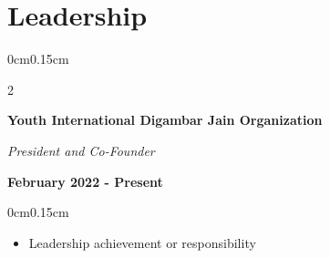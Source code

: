 \documentclass[10pt, letterpaper]{article}
\newenvironment{highlights}{
    \begin{itemize}[topsep=0pt, parsep=0pt, partopsep=0pt, itemsep=0pt, leftmargin=0.6cm]
}{
    \end{itemize}
}
\newenvironment{onecolentry}{
    \begin{adjustwidth}{0cm}{0.15cm}
}{
    \end{adjustwidth}
}
\newenvironment{twocolentry}[2][]{
    \onecolentry
    \def\secondColumn{#2}
    \setcolumnwidth{\fill, 4cm}
    \begin{paracol}{2}
}{
    \switchcolumn \raggedleft \secondColumn
    \end{paracol}
    \endonecolentry
}
\begin{document}
    \vspace{0.1cm}
    \section{Leadership}
    \vspace{0.1cm}

    \begin{twocolentry}{\textbf{February 2022 - Present}}
        \textbf{Youth International Digambar Jain Organization}
        
        \textit{President and Co-Founder}
    \end{twocolentry}

    \begin{onecolentry}
        \begin{highlights}
            \item Leadership achievement or responsibility
        \end{highlights}
    \end{onecolentry}

    \vspace{0.1cm}
\end{document}
